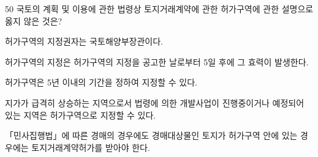 \begin{question}{50}
국토의 계획 및 이용에 관한 법령상 토지거래계약에 관한 허가구역에 관한 설명으로 옳지 않은 것은?
\begin{choices}
  \item 허가구역의 지정권자는 국토해양부장관이다.
  \item 허가구역의 지정은 허가구역의 지정을 공고한 날로부터 5일 후에 그 효력이 발생한다.
  \item 허가구역은 5년 이내의 기간을 정하여 지정할 수 있다.
  \item 지가가 급격히 상승하는 지역으로서 법령에 의한 개발사업이 진행중이거나 예정되어 있는 지역은 허가구역으로 지정할 수 있다.
  \item 「민사집행법」에 따른 경매의 경우에도 경매대상물인 토지가 허가구역 안에 있는 경우에는 토지거래계약허가를 받아야 한다.
\end{choices}
\end{question}

